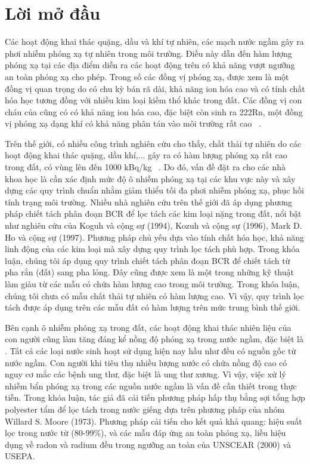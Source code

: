 \chapter*{Lời mở đầu}


Các hoạt động khai thác quặng, dầu và khí tự nhiên, các mạch nước ngầm gây ra phơi nhiễm phóng xạ tự nhiên trong môi trường. Điều này dẫn đến hàm lượng phóng xạ tại các địa điểm diễn ra các hoạt động trên có khả năng vượt ngưỡng an toàn phóng xạ cho phép. Trong số các đồng vị phóng xạ,  được xem là một đồng vị quan trọng do có chu kỳ bán rã dài, khả năng ion hóa cao và có tính chất hóa học tương đồng với nhiều kim loại kiềm thổ khác trong đất. Các đồng vị con cháu của  cũng có có khả năng ion hóa cao, đặc biệt  còn sinh ra 222Rn, một đồng vị phóng xạ dạng khí có khả năng phân tán vào môi trường rất cao ~\cite{IAEANo476:revise}.

Trên thế giới, có nhiều công trình nghiên cứu cho thấy, chất thải tự nhiên do các hoạt động khai thác quặng, dầu khí,...  gây ra có hàm lượng phóng xạ rất cao trong đất, có vùng lên đến 1000 kBq/kg ~\cite{BCR:JamalAlAbdullah}. Do đó, vấn đề đặt ra cho các nhà khoa học là cần xác định mức độ ô nhiễm phóng xạ tại các khu vực này và xây dựng các quy trình chuẩn nhằm giảm thiểu tối đa phơi nhiễm phóng xạ, phục hồi tính trạng môi trường. Nhiều nhà nghiên cứu trên thế giới đã áp dụng phương pháp chiết tách phân đoạn BCR để lọc tách các kim loại nặng trong đất, nổi bật như nghiên cứu của Koguh và cộng sự (1994),  Kozuh  và cộng sự (1996), Mark D. Ho và cộng sự (1997). Phương pháp chủ yếu dựa vào tính chất hóa học, khả năng linh động của các kim loại mà xây dựng quy trình lọc tách phù hợp. Trong khóa luận, chúng tôi áp dụng quy trình chiết tách phân đoạn BCR để chiết tách  từ pha rắn (đất) sang pha lỏng. Đây cũng được xem là một trong những kỹ thuật làm giàu  từ các mẫu có chứa hàm lượng  cao trong môi trường. Trong khóa luận, chúng tôi chưa có mẫu chất thải tự nhiên có hàm lượng  cao. Vì vậy, quy trình lọc tách được áp dụng trên các mẫu đất có hàm lượng  trên mức trung bình thế giới. 

Bên cạnh ô nhiễm phóng xạ  trong đất, các hoạt động khai thác nhiên liệu của con người cũng làm tăng đáng kể nồng độ phóng xạ trong nước ngầm, đặc biệt là . Tất cả các loại nước sinh hoạt sử dụng hiện nay hầu như đều có nguồn gốc từ nước ngầm. Con người khi tiêu thụ nhiều lượng nước có chứa nồng độ  cao có nguy cơ mắc các bệnh ung thư, đặc biệt là ung thư xương. Vì vậy, việc xử lý nhiễm bẩn phóng xạ trong các nguồn nước ngầm là vấn đề cần thiết trong thực tiễn. Trong khóa luận,  tác giả đã cải tiến phương pháp hấp thụ  bằng sợi tổng hợp polyester tẩm  để lọc tách  trong nước giếng dựa trên phương pháp của nhóm Willard S. Moore (1973). Phương pháp cải tiến cho kết quả khả quang: hiệu suất lọc  trong nước từ (80-99\%), và các mẫu  đáp ứng an toàn phóng xạ, liều hiệu dụng về radon và radium đều trong ngưỡng an toàn của UNSCEAR (2000) và USEPA.


